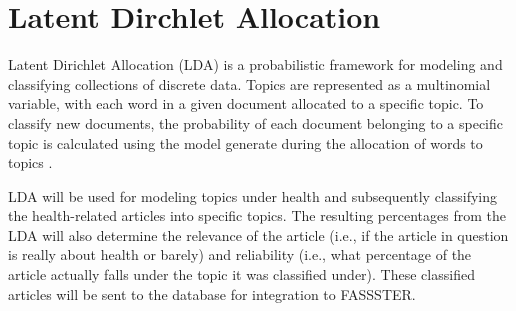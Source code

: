 \section{Latent Dirchlet Allocation}
Latent Dirichlet Allocation (LDA) is a probabilistic framework for modeling and classifying collections of discrete data. Topics are represented as a multinomial variable, with each word in a given document allocated to a specific topic. To classify new documents, the probability of each document belonging to a specific topic is calculated using the model generate during the allocation of words to topics \cite{blei2002latent}.

LDA will be used for modeling topics under health and subsequently classifying the health-related articles into specific topics. The resulting percentages from the LDA will also determine the relevance of the article (i.e., if the article in question is really about health or barely) and reliability (i.e., what percentage of the article actually falls under the topic it was classified under). These classified articles will be sent to the database for integration to FASSSTER.